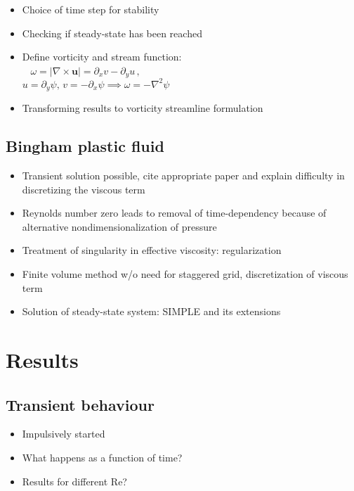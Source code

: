 \documentclass[final,3p,twocolumn]{elsarticle}
\begin{document}
\begin{itemize}
    \item Choice of time step for stability \cite{kress2006time}
    \item Checking if steady-state has been reached
    \item Define vorticity and stream function: \\ 
        $\omega = |\nabla \times \bm{u}| = \partial_x v-\partial_y u\,,$ \\
        $u=\partial_y \psi,\,v=-\partial_x \psi \implies \omega=-\nabla^2 \psi$
    \item Transforming results to vorticity streamline formulation
\end{itemize}

\subsection{Bingham plastic fluid}
\label{subsec:bingham}

\begin{itemize}
    \item Transient solution possible, cite appropriate paper and explain
        difficulty in discretizing the viscous term
    \item Reynolds number zero leads to removal of time-dependency because of
        alternative nondimensionalization of pressure 
    \item Treatment of singularity in effective viscosity: regularization
    \item Finite volume method w/o need for staggered grid, discretization of
        viscous term
    \item Solution of steady-state system: SIMPLE and its extensions
\end{itemize}

\section{Results}
\label{sec:results}

\subsection{Transient behaviour}
\label{subsec:transient}

\begin{itemize}
    \item Impulsively started
    \item What happens as a function of time? 
    \item Results for different Re? 
\end{itemize}
\end{document}
